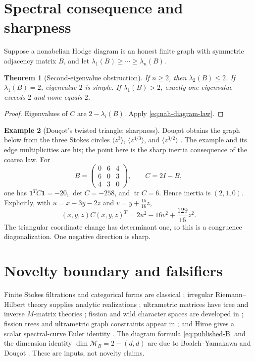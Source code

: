 \documentclass[11pt,a4paper]{amsart}
\theoremstyle{plain}
\newtheorem{theorem}{Theorem}[section]
\theoremstyle{definition}
\newtheorem{example}[theorem]{Example}
\newcommand{\one}{\mathbf 1}
\newcommand{\Mcal}{\mathcal M}
\begin{document}
\section{Spectral consequence and sharpness}\label{sec:spectral}

Suppose a nonabelian Hodge diagram is an honest finite graph with symmetric adjacency matrix $B$,
and let $\lambda_1(B)\geq\cdots\geq\lambda_n(B)$.

\begin{theorem}[Second-eigenvalue obstruction]\label{thm:lambda-two}
If $n\geq2$, then $\lambda_2(B)\leq2$.  If $\lambda_1(B)=2$, eigenvalue $2$ is simple.  If
$\lambda_1(B)>2$, exactly one eigenvalue exceeds $2$ and none equals $2$.
\end{theorem}

\begin{proof}
Eigenvalues of $C$ are $2-\lambda_i(B)$.  Apply \eqref{eq:nah-diagram-law}.
\end{proof}

\begin{example}[Dou\c{c}ot's twisted triangle; sharpness]\label{ex:triangle}
Dou\c{c}ot obtains the graph below from the three Stokes circles
$\langle z^3\rangle$, $\langle z^{4/3}\rangle$, and $\langle z^{3/2}\rangle$
\cite[Proposition~3.3]{Doucot2025}.  The example and its edge multiplicities are his; the point
here is the sharp inertia consequence of the coarea law.  For
\[
 B=\begin{pmatrix}0&6&4\\6&0&3\\4&3&0\end{pmatrix},\qquad C=2I-B,
\]
one has $\one^TC\one=-20$, $\det C=-258$, and $\operatorname{tr}C=6$.  Hence inertia is
$(2,1,0)$.  Explicitly, with
$u=x-3y-2z$ and $v=y+\frac{15}{16}z$,
\[
 (x,y,z)C(x,y,z)^T=2u^2-16v^2+\frac{129}{16}z^2.
\]
The triangular coordinate change has determinant one, so this is a congruence diagonalization.
One negative direction is sharp.
\end{example}

\section{Novelty boundary and falsifiers}\label{sec:novelty}

Finite Stokes filtrations and categorical forms are classical \cite{Sabbah}; irregular
Riemann--Hilbert theory supplies analytic realizations \cite{DKRH}; ultrametric matrices have tree
and inverse $M$-matrix theories \cite{Martinez1994,McDonald1995,Nabben1995}; fission and wild
character spaces are developed in \cite{Boalch2014}; fission trees and ultrametric graph constraints
appear in \cite{Boalch2025,Doucot2025}; and Hiroe gives a scalar spectral-curve Euler identity
\cite{Hiroe2019}.  The diagram formula \eqref{eq:published-B} and the dimension identity
$\dim\Mcal_B=2-(d,d)$ are due to Boalch--Yamakawa and Dou\c{c}ot
\cite{BoalchYamakawa2020,Doucot2021}.  These are inputs, not novelty claims.
\end{document}
